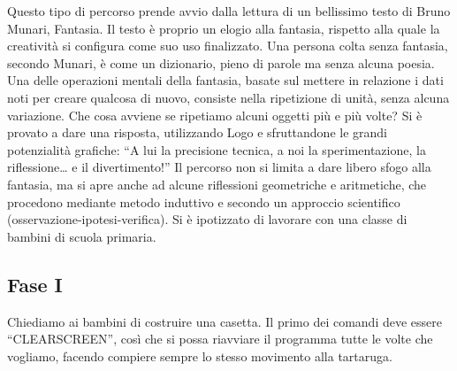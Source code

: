 Questo tipo di percorso prende avvio dalla lettura di un bellissimo testo di
Bruno Munari, Fantasia.  Il testo è proprio un elogio alla fantasia, rispetto
alla quale la creatività si configura come suo uso finalizzato. Una persona
colta senza fantasia, secondo Munari, è come un dizionario, pieno di parole ma
senza alcuna poesia. Una delle operazioni mentali della fantasia, basate sul
mettere in relazione i dati noti per creare qualcosa di nuovo, consiste nella
ripetizione di unità, senza alcuna variazione. Che cosa avviene se ripetiamo
alcuni oggetti più e più volte? Si è provato a dare una risposta, utilizzando
Logo e sfruttandone le grandi potenzialità grafiche: “A lui la precisione
tecnica, a noi la sperimentazione, la riflessione… e il divertimento!” Il
percorso non si limita a dare libero sfogo alla fantasia, ma si apre anche ad
alcune riflessioni geometriche e aritmetiche, che procedono mediante metodo
induttivo e secondo un approccio scientifico (osservazione-ipotesi-verifica).
Si è ipotizzato di lavorare con una classe di bambini di scuola primaria.

\subsection{Fase I}

Chiediamo ai bambini di costruire una casetta. Il primo dei comandi deve essere
“CLEARSCREEN”, così che si possa riavviare il programma tutte le volte che
vogliamo, facendo compiere sempre lo stesso movimento alla tartaruga.

